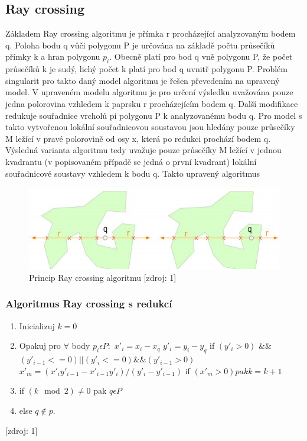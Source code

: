 \documentclass[a4paper, 12pt]{article}
\begin{document}
\subsection{Ray crossing}
Základem Ray crossing algoritmu je přímka r procházející analyzovaným bodem q. Poloha bodu q
vůči polygonu P je určována na základě počtu průsečíků přímky k a hran polygonu $p_i$. Obecně platí pro bod q vně polygonu P, že počet průsečíků k je sudý, lichý počet k platí pro bod q uvnitř polygonu P. Problém singularit pro takto daný model algoritmu je řešen převedením na upravený model. V upraveném modelu algoritmu je pro určení výsledku uvažována pouze jedna polorovina vzhledem k paprsku r procházejícím bodem q. Další modifikace redukuje souřadnice vrcholů pi polygonu P k analyzovanému bodu q. Pro model s takto vytvořenou lokální souřadnicovou
soustavou jsou hledány pouze průsečíky M ležící v pravé polorovině od osy x, která po redukci prochází bodem q. Výsledná varianta algoritmu tedy uvažuje pouze průsečíky M ležící v jednou
kvadrantu (v popisovaném případě se jedná o první kvadrant) lokální souřadnicové soustavy vzhledem k bodu q. Takto upravený algoritmus

\begin{figure}[h!]
	\centering
	\includegraphics[width=12cm]{raz.jpg}
	\caption{Princip Ray crossing algoritmu [zdroj: 1]}
\end{figure}

\subsubsection{Algoritmus Ray crossing s redukcí}
\begin{enumerate}
\item Inicializuj $k = 0$
\item Opakuj pro $ \forall $ body $ p_i \epsilon P: $
\subitem  $ x'_i = x_i - x_q $
\subitem  $ y'_i = y_i - y_q $
\subitem  if $ (y'_i > 0)$ \&\& $(y'_{i-1} <= 0)||(y'_i <= 0)$\&\&$(y'_{i-1} > 0)$
\subitem $ x'_m = (x'_i y'_{i-1} - x'_{i-1} y'_i)/(y'_i - y'_{i-1}) $
\subitem if $ (x'_m > 0) pak k = k+1 $
\item if $(k \mod 2) \neq 0$ pak $q \epsilon P $
\item else $ q \notin p.$
\end{enumerate} [zdroj: 1]
\end{document}
